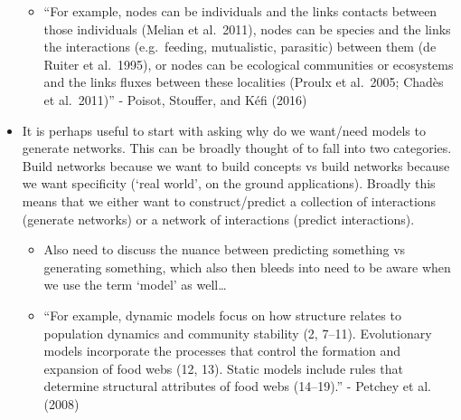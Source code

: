 \documentclass[
  letterpaper,
  DIV=11,
  numbers=noendperiod]{scrartcl}
\providecommand{\tightlist}{%
  \setlength{\itemsep}{0pt}\setlength{\parskip}{0pt}}\usepackage{longtable,booktabs,array}
\begin{document}
\begin{itemize}
  \begin{itemize}
  \tightlist
  \item
    ``For example, nodes can be individuals and the links contacts
    between those individuals (Melian et al.~2011), nodes can be species
    and the links the interactions (e.g.~feeding, mutualistic,
    parasitic) between them (de Ruiter et al.~1995), or nodes can be
    ecological communities or ecosystems and the links fluxes between
    these localities (Proulx et al.~2005; Chadès et al.~2011)'' -
    Poisot, Stouffer, and Kéfi (2016)
  \end{itemize}
\item
  It is perhaps useful to start with asking why do we want/need models
  to generate networks. This can be broadly thought of to fall into two
  categories. Build networks because we want to build concepts vs build
  networks because we want specificity (`real world', on the ground
  applications). Broadly this means that we either want to
  construct/predict a collection of interactions (generate networks) or
  a network of interactions (predict interactions).

  \begin{itemize}
  \tightlist
  \item
    Also need to discuss the nuance between predicting something vs
    generating something, which also then bleeds into need to be aware
    when we use the term `model' as well\ldots{}
  \item
    ``For example, dynamic models focus on how structure relates to
    population dynamics and community stability (2, 7--11). Evolutionary
    models incorporate the processes that control the formation and
    expansion of food webs (12, 13). Static models include rules that
    determine structural attributes of food webs (14--19).'' - Petchey
    et al. (2008)
  \end{itemize}
\end{itemize}
\end{document}
